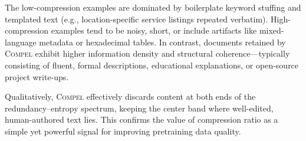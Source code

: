 The low-compression examples are dominated by boilerplate keyword stuffing and templated text (e.g., location-specific service listings repeated verbatim).
High-compression examples tend to be noisy, short, or include artifacts like mixed-language metadata or hexadecimal tables.
In contrast, documents retained by \textsc{Compel} exhibit higher information density and structural coherence---typically consisting of fluent, formal descriptions, educational explanations, or open-source project write-ups.

Qualitatively, \textsc{Compel} effectively discards content at both ends of the redundancy--entropy spectrum, keeping the center band where well-edited, human-authored text lies.
This confirms the value of compression ratio as a simple yet powerful signal for improving pretraining data quality.
